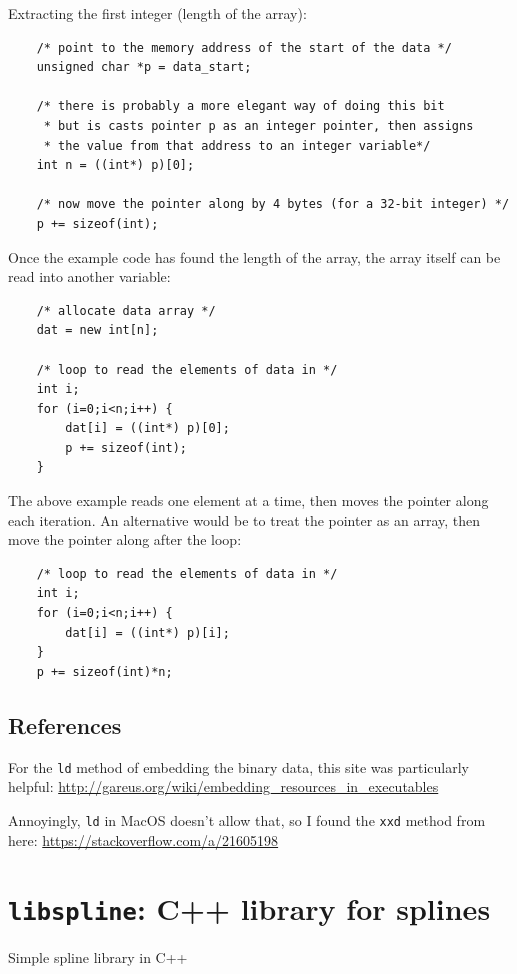 	Extracting the first integer (length of the array):
	\begin{verbatim}
	/* point to the memory address of the start of the data */
	unsigned char *p = data_start;
	
	/* there is probably a more elegant way of doing this bit
	 * but is casts pointer p as an integer pointer, then assigns
	 * the value from that address to an integer variable*/
	int n = ((int*) p)[0];
	
	/* now move the pointer along by 4 bytes (for a 32-bit integer) */
	p += sizeof(int);
	\end{verbatim}
	
	Once the example code has found the length of the array, the array itself can be read into another variable:
	\begin{verbatim}
	/* allocate data array */
	dat = new int[n];
	
	/* loop to read the elements of data in */
	int i;
	for (i=0;i<n;i++) {
		dat[i] = ((int*) p)[0];
		p += sizeof(int);
	}
	\end{verbatim}
	
	The above example reads one element at a time, then moves the pointer along each iteration. An alternative would be to treat the pointer as an array, then move the pointer along after the loop:
	\begin{verbatim}
	/* loop to read the elements of data in */
	int i;
	for (i=0;i<n;i++) {
		dat[i] = ((int*) p)[i];
	}
	p += sizeof(int)*n;
	\end{verbatim}
	
	\subsection{References}
	
	For the \texttt{ld} method of embedding the binary data, this site was particularly helpful: \url{http://gareus.org/wiki/embedding_resources_in_executables}
	
	Annoyingly, \texttt{ld} in MacOS doesn't allow that, so I found the \texttt{xxd} method from here: \url{https://stackoverflow.com/a/21605198}
	


	\section{\texttt{libspline}: C++ library for splines}


Simple spline library in C++

